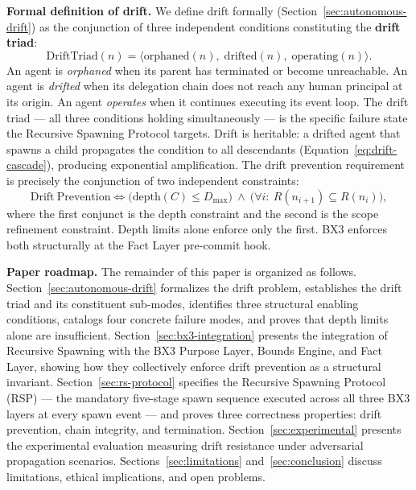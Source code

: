 \textbf{Formal definition of drift.} We define drift formally (Section~\ref{sec:autonomous-drift}) as the conjunction of three independent conditions constituting the \textbf{drift triad}:
\[
\mathrm{DriftTriad}(n) = \langle \mathrm{orphaned}(n),\; \mathrm{drifted}(n),\; \mathrm{operating}(n) \rangle.
\]
An agent is \emph{orphaned} when its parent has terminated or become unreachable. An agent is \emph{drifted} when its delegation chain does not reach any human principal at its origin. An agent \emph{operates} when it continues executing its event loop. The drift triad — all three conditions holding simultaneously — is the specific failure state the Recursive Spawning Protocol targets. Drift is heritable: a drifted agent that spawns a child propagates the condition to all descendants (Equation~\ref{eq:drift-cascade}), producing exponential amplification. The drift prevention requirement is precisely the conjunction of two independent constraints:
\[
\mathrm{Drift\ Prevention} \iff \bigl( \mathrm{depth}(C) \leq D_{\max} \bigr)\ \land\ \bigl( \forall i:\ R(n_{i+1}) \subseteq R(n_i) \bigr),
\]
where the first conjunct is the depth constraint and the second is the scope refinement constraint. Depth limits alone enforce only the first. BX3 enforces both structurally at the Fact Layer pre-commit hook.

\textbf{Paper roadmap.} The remainder of this paper is organized as follows. Section~\ref{sec:autonomous-drift} formalizes the drift problem, establishes the drift triad and its constituent sub-modes, identifies three structural enabling conditions, catalogs four concrete failure modes, and proves that depth limits alone are insufficient. Section~\ref{sec:bx3-integration} presents the integration of Recursive Spawning with the BX3 Purpose Layer, Bounds Engine, and Fact Layer, showing how they collectively enforce drift prevention as a structural invariant. Section~\ref{sec:rs-protocol} specifies the Recursive Spawning Protocol (RSP) — the mandatory five-stage spawn sequence executed across all three BX3 layers at every spawn event — and proves three correctness properties: drift prevention, chain integrity, and termination. Section~\ref{sec:experimental} presents the experimental evaluation measuring drift resistance under adversarial propagation scenarios. Sections~\ref{sec:limitations} and~\ref{sec:conclusion} discuss limitations, ethical implications, and open problems.